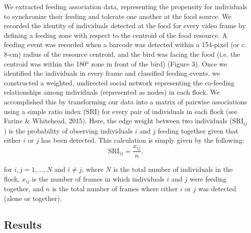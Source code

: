 \documentclass[11pt,a4paper,oneside]{article}
\begin{document}
We extracted feeding association data, representing the propensity for individuals to synchronize their feeding and tolerate one another at the food source. We recorded the identity of individuals detected at the food for every video frame by defining a feeding zone with respect to the centroid of the food resource. A feeding event was recorded when a barcode was detected within a 154‐pixel (or c. 8‐cm) radius of the resource centroid, and the bird was facing the food (i.e. the centroid was within the 180° zone in front of the bird) (Figure 3). Once we identified the individuals in every frame and classified feeding events, we constructed a weighted, undirected social network representing the co‐feeding relationships among individuals (represented as nodes) in each flock. We accomplished this by transforming our data into a matrix of pairwise associations using a simple ratio index ($\mathrm{SRI}$) for every pair of individuals in each flock (see Farine & Whitehead, 2015). Here, the edge weight between two individuals ($\mathrm{SRI}_{ij}$) is the probability of observing individuals $i$ and $j$ feeding together given that either $i$ or $j$ has been detected. This calculation is simply given by the following:
\begin{equation}
    \mathrm{SRI}_{ij} = \frac{x_{ij}}{n},
\end{equation}

for $i, j = 1, \dots, N$ and $i \neq j$, where $N$ is the total number of individuals in the flock, $x_{ij}$ is the number of frames in which individuals $i$ and $j$ were feeding together, and $n$ is the total number of frames where either $i$ or $j$ was detected (alone or together).

\subsection{Results}
\end{document}
